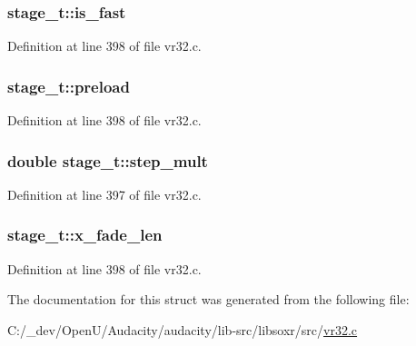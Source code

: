 \subsubsection[{\texorpdfstring{is\+\_\+fast}{is_fast}}]{ stage\+\_\+t\+::is\+\_\+fast}\hypertarget{structstage__t_a7956a87a6fc6f8d8586d1efc6c9af64c}{}\label{structstage__t_a7956a87a6fc6f8d8586d1efc6c9af64c}


Definition at line 398 of file vr32.\+c.

\subsubsection[{\texorpdfstring{preload}{preload}}]{ stage\+\_\+t\+::preload}\hypertarget{structstage__t_a7bf43299a116ecf6bd77efdd78d4d7cc}{}\label{structstage__t_a7bf43299a116ecf6bd77efdd78d4d7cc}


Definition at line 398 of file vr32.\+c.

\subsubsection[{\texorpdfstring{step\+\_\+mult}{step_mult}}]{\setlength{\rightskip}{0pt plus 5cm}double stage\+\_\+t\+::step\+\_\+mult}\hypertarget{structstage__t_afce5990acce8fa9c2f0b0df755585596}{}\label{structstage__t_afce5990acce8fa9c2f0b0df755585596}


Definition at line 397 of file vr32.\+c.

\subsubsection[{\texorpdfstring{x\+\_\+fade\+\_\+len}{x_fade_len}}]{ stage\+\_\+t\+::x\+\_\+fade\+\_\+len}\hypertarget{structstage__t_ad5161819fd34700f9628a37bf4f398b7}{}\label{structstage__t_ad5161819fd34700f9628a37bf4f398b7}


Definition at line 398 of file vr32.\+c.



The documentation for this struct was generated from the following file\+:\begin{DoxyCompactItemize}
\item 
C\+:/\+\_\+dev/\+Open\+U/\+Audacity/audacity/lib-\/src/libsoxr/src/\hyperlink{vr32_8c}{vr32.\+c}\end{DoxyCompactItemize}
